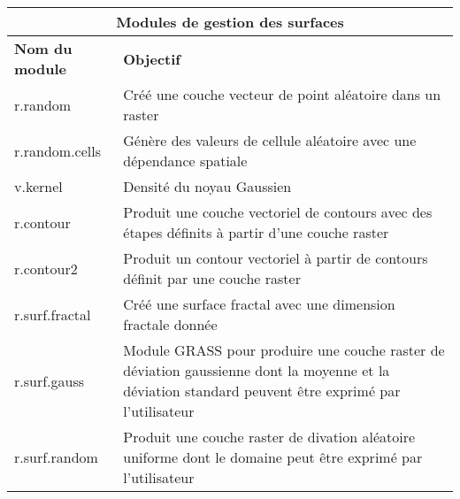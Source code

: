 \begin{table}[H]
\centering
 \begin{tabular}{|p{4cm}|p{10cm}|}
  \hline \multicolumn{2}{|c|}{\textbf{Modules de gestion des surfaces}} \\
  \hline \textbf{Nom du module} & \textbf{Objectif} \\
  \hline r.random & Créé une couche vecteur de point aléatoire dans un raster\\
  \hline r.random.cells & Génère des valeurs de cellule aléatoire avec une dépendance spatiale \\
  \hline v.kernel & Densité du noyau Gaussien \\
  \hline r.contour & Produit une couche vectoriel de contours avec des étapes définits à partir d'une couche raster\\
  \hline r.contour2 & Produit un contour vectoriel à partir de contours définit par une couche raster\\
  \hline r.surf.fractal & Créé une surface fractal avec une dimension fractale donnée\\
  \hline r.surf.gauss & Module GRASS pour produire une couche raster de déviation gaussienne dont la moyenne et la déviation standard peuvent \^etre exprimé par l'utilisateur\\
  \hline r.surf.random & Produit une couche raster de divation aléatoire uniforme dont le domaine peut \^etre exprimé par l'utilisateur\\

\end{tabular}
\end{table}
